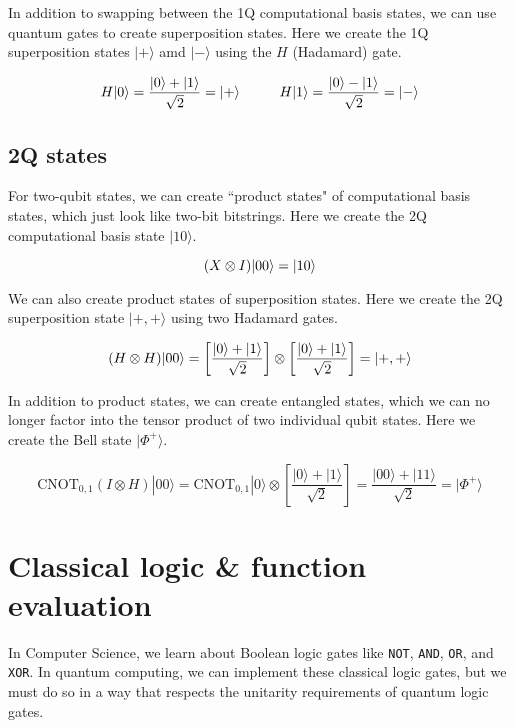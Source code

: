 \documentclass[12pt, letterpaper]{article}
\begin{document}
\noindent
In addition to swapping between the 1Q computational basis states, we can use quantum gates to create superposition states. Here we create the 1Q superposition states $|+\rangle$ amd $|-\rangle$ using the $H$ (Hadamard) gate.\vspace{2 mm}

$$H|0\rangle = \dfrac{|0\rangle + |1\rangle}{\sqrt{2}} = |+\rangle \hspace{1 cm} H|1\rangle = \dfrac{|0\rangle - |1\rangle}{\sqrt{2}} = |-\rangle$$

\subsection{2Q states}

For two-qubit states, we can create ``product states" of computational basis states, which just look like two-bit bitstrings. Here we create the 2Q computational basis state $|10\rangle$.

$$(X \otimes I)|00\rangle = |10\rangle \vspace{3 mm}$$

\noindent
We can also create product states of superposition states. Here we create the 2Q superposition state $|+,+\rangle$ using two Hadamard gates.

$$(H \otimes H)|00\rangle = \left[ \dfrac{|0\rangle + |1\rangle}{\sqrt{2}}\right] \otimes \left[ \dfrac{|0\rangle + |1\rangle}{\sqrt{2}}\right] = |+,+\rangle \vspace{3 mm}$$

\noindent
In addition to product states, we can create entangled states, which we can no longer factor into the tensor product of two individual qubit states. Here we create the Bell state $|\Phi^+\rangle$.

$$\text{CNOT}_{0,1}(I \otimes H)|00\rangle = \text{CNOT}_{0,1}|0\rangle \otimes \left[ \dfrac{|0\rangle + |1\rangle}{\sqrt{2}}\right] = \dfrac{|00\rangle + |11\rangle}{\sqrt{2}} = |\Phi^+\rangle$$

\section{Classical logic \& function evaluation}

In Computer Science, we learn about Boolean logic gates like \texttt{NOT},
\texttt{AND}, \texttt{OR}, and \texttt{XOR}. In quantum computing, we can implement these classical logic gates, but we must do so in a way that respects the unitarity requirements of quantum logic gates.
\end{document}
